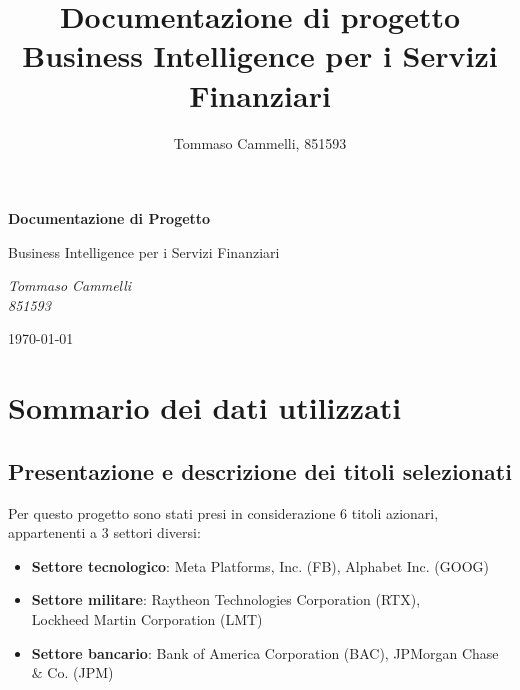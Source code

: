 \documentclass{article}
\title{Documentazione di progetto\\ Business Intelligence per i Servizi Finanziari}
\author{Tommaso Cammelli, 851593}
\begin{document}

\begin{titlepage}
  \begin{center}
      \vspace*{4cm}
          
      \Huge
      \textbf{Documentazione di Progetto}
          
      \vspace{0.5cm}
      \LARGE
      Business Intelligence per i Servizi Finanziari
      
      \vspace{1cm}

      {\Large\itshape Tommaso Cammelli\\851593\par}

      \vfill

      {\large \today\par}
          
  \end{center}
\end{titlepage}


\pagebreak

\tableofcontents

\section{Sommario dei dati utilizzati}

\subsection{Presentazione e descrizione dei titoli selezionati}

Per questo progetto sono stati presi in considerazione 6 titoli azionari, appartenenti a 3 settori diversi:

\begin{itemize}
    \item \textbf{Settore tecnologico}: Meta Platforms, Inc. (FB), Alphabet Inc. (GOOG)
    \item \textbf{Settore militare}: Raytheon Technologies Corporation (RTX),\\ Lockheed Martin Corporation (LMT)
    \item \textbf{Settore bancario}: Bank of America Corporation (BAC), JPMorgan Chase \& Co. (JPM)
\end{itemize}
\end{document}
